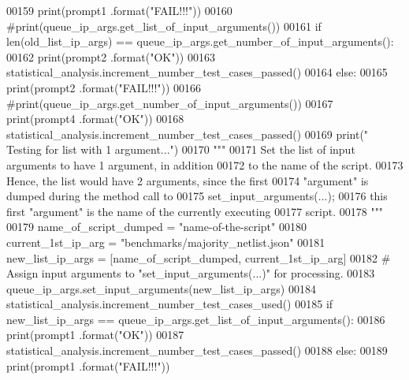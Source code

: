 \begin{DoxyCode}
00159                 print(prompt1 .format(\textcolor{stringliteral}{"FAIL!!!"}))
00160                 \textcolor{comment}{#print(queue\_ip\_args.get\_list\_of\_input\_arguments())}
00161             \textcolor{keywordflow}{if} len(old\_list\_ip\_args) == queue\_ip\_args.get\_number\_of\_input\_arguments():
00162                 print(prompt2 .format(\textcolor{stringliteral}{"OK"}))
00163                 statistical\_analysis.increment\_number\_test\_cases\_passed()
00164             \textcolor{keywordflow}{else}:
00165                 print(prompt2 .format(\textcolor{stringliteral}{"FAIL!!!"}))
00166                 \textcolor{comment}{#print(queue\_ip\_args.get\_number\_of\_input\_arguments())}
00167             print(prompt4 .format(\textcolor{stringliteral}{"OK"}))
00168             statistical\_analysis.increment\_number\_test\_cases\_passed()
00169         print(\textcolor{stringliteral}{" Testing for list with 1 argument..."})
00170         \textcolor{stringliteral}{"""}
00171 \textcolor{stringliteral}{            Set the list of input arguments to have 1 argument, in addition}
00172 \textcolor{stringliteral}{                to the name of the script.}
00173 \textcolor{stringliteral}{            Hence, the list would have 2 arguments, since the first}
00174 \textcolor{stringliteral}{                "argument" is dumped during the method call to}
00175 \textcolor{stringliteral}{                set\_input\_arguments(...);}
00176 \textcolor{stringliteral}{                this first "argument" is the name of the currently executing}
00177 \textcolor{stringliteral}{                    script.}
00178 \textcolor{stringliteral}{        """}
00179         name\_of\_script\_dumped = \textcolor{stringliteral}{"name-of-the-script"}
00180         current\_1st\_ip\_arg = \textcolor{stringliteral}{"benchmarks/majority\_netlist.json"}
00181         new\_list\_ip\_args = [name\_of\_script\_dumped, current\_1st\_ip\_arg]
00182         \textcolor{comment}{#   Assign input arguments to "set\_input\_arguments(...)" for processing.}
00183         queue\_ip\_args.set\_input\_arguments(new\_list\_ip\_args)
00184         statistical\_analysis.increment\_number\_test\_cases\_used()
00185         \textcolor{keywordflow}{if} new\_list\_ip\_args == queue\_ip\_args.get\_list\_of\_input\_arguments():
00186             print(prompt1 .format(\textcolor{stringliteral}{"OK"}))
00187             statistical\_analysis.increment\_number\_test\_cases\_passed()
00188         \textcolor{keywordflow}{else}:
00189             print(prompt1 .format(\textcolor{stringliteral}{"FAIL!!!"}))

\end{DoxyCode}
